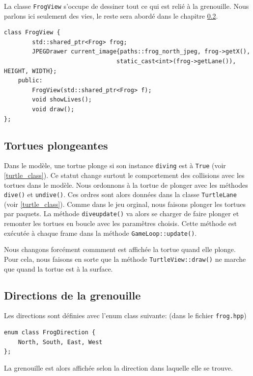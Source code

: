 \documentclass[a4paper, 12pt]{article}
\begin{document}
La classe \texttt{FrogView} s'occupe de dessiner tout ce qui est relié à la grenouille. 
Nous parlons ici seulement des vies, le reste sera abordé dans le chapitre \ref{frogview}. 

\begin{lstlisting}
class FrogView {    
        std::shared_ptr<Frog> frog;
        JPEGDrawer current_image{paths::frog_north_jpeg, frog->getX(),
                                static_cast<int>(frog->getLane()), HEIGHT, WIDTH};
    public:
        FrogView(std::shared_ptr<Frog> f);
        void showLives();
        void draw();
};
\end{lstlisting}

\subsection{Tortues plongeantes} \label{diving_turtles}

Dans le modèle, 
une tortue plonge si son instance \texttt{diving} est à \texttt{True} (voir \ref{turtle_class}). 
Ce statut change surtout le comportement des collisions avec les tortues dans le modèle. 
Nous ordonnons à la tortue de plonger avec les méthodes \texttt{dive()} et \texttt{undive()}. 
Ces ordres sont alors données dans la classe \texttt{TurtleLane} (voir \ref{turtle_class}). 
Comme dans le jeu orginal, nous faisons plonger les tortues par paquets. 
La méthode \texttt{dive\textunderscore update()} va alors se charger de faire plonger et 
remonter les tortues en boucle avec les paramêtres choisis. 
Cette méthode est exécutée à chaque frame dans la méthode \texttt{GameLoop::update()}.

Nous changons forcément commment est affichée la tortue quand elle plonge. Pour cela, nous faisons en sorte que la méthode \texttt{TurtleView::draw()} ne marche que quand la tortue est à la surface.

\subsection{Directions de la grenouille} \label{frogview}

Les directions sont définies avec l'enum class suivante: (dans le fichier \texttt{frog.hpp})

\begin{lstlisting}
enum class FrogDirection {
    North, South, East, West
};
\end{lstlisting}

La grenouille est alors affichée selon la direction dans laquelle elle se trouve.
\end{document}
